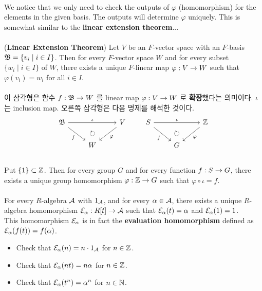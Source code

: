 \\
We notice that we only need to check the outputs of $\varphi$ (homomorphism) for the elements in the given basis. The outputs will determine $\varphi$ uniquely. This is somewhat similar to the \textbf{linear extension theorem}...\\
\\
 (\textbf{Linear Extension Theorem}) Let $V$ be an $F$-vector space with an $F$-basis $\mathfrak{B} = \{v_i \mid i\in I\}$. Then for every $F$-vector space $W$ and for every subset $\{w_i\mid i\in I\}$ of $W$, there exists a unique $F$-linear map $\varphi:V\rightarrow W$ such that $\varphi(v_i) = w_i$ for all $i\in I$.\\
\\
이 삼각형은 함수 $f:\mathfrak{B}\rightarrow W$ 를 linear map $\varphi: V\rightarrow W$ 로 \textbf{확장}했다는 의미이다. $\iota$ 는 inclusion map. 오른쪽 삼각형은 다음 명제를 해석한 것이다.
$$
\begin{tikzcd}
\mf{B} \arrow{rr}{\iota} \arrow[swap]{dr}{f} & \arrow[d, phantom, "\circlearrowright"]& V\arrow{dl}{\varphi} \\
& W  &
\end{tikzcd} \qquad
\begin{tikzcd}
S \arrow{rr}{\iota} \arrow[swap]{dr}{f} & \arrow[d, phantom, "\circlearrowright"]& \Z\arrow{dl}{\varphi} \\
& G  &
\end{tikzcd}
$$
\\
 Put $\{1\}\subset\mathbb{Z}$. Then for every group $G$ and for every function $f:S\rightarrow G$, there exists a unique group homomorphism $\varphi: \mathbb{Z}\rightarrow G$ such that $\varphi\circ \iota = f$.\\
\\
 For every $R$-algebra $\mathcal{A}$ with $1_{\mathcal{A}}$, and for every $\alpha\in \mathcal{A}$, there exists a unique $R$-algebra homomorphism $\mathcal{E}_\alpha:R[t]\rightarrow\mathcal{A}$ such that $\mathcal{E}_\alpha(t) = \alpha$ and $\mathcal{E}_\alpha(1)=1$.\\
This homomorphism $\mathcal{E}_\alpha$ is in fact the \textbf{evaluation homomorphism} defined as $\mathcal{E}_\alpha(f(t)) = f(\alpha)$.
\begin{itemize}
	\item Check that $\mathcal{E}_\alpha(n) = n\cdot 1_{\mathcal{A}}$ for $n\in \mathbb{Z}$.
	\item Check that $\mathcal{E}_\alpha(nt) = n\alpha$ for $n\in \mathbb{Z}$.
	\item Check that $\mathcal{E}_\alpha(t^n) = \alpha^n$ for $n\in \mathbb{N}$.
\end{itemize}~

